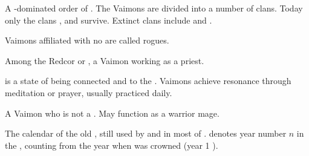 \begin{gloss}
\begin{comment}
\paragraph{Vaimon}
\end{comment}
A -dominated order of . 
The Vaimons are divided into a number of clans.
Today only the clans ,  and  survive. 
Extinct clans include \Zether and \Delaen. 

Vaimons affiliated with no \vclan are called rogues. 






\begin{subgloss}
  \begin{comment}
  \subparagraph{\cleric}
  \end{comment}
  \gitem{\cleric}
  Among the Redcor or \Telcra, a Vaimon working as a priest. 
  
  
  
  
  
  \begin{comment}
  \subparagraph{resonance}
  \end{comment}
   is a state of being connected and  to the \Archons. 
  Vaimons achieve resonance through meditation or prayer, usually practiced daily. 
  
  
  
  
  
  \begin{comment}
  \subparagraph{\templar}
  \end{comment}
  \gitem[\templars]{\templar}
  A Vaimon who is not a \cleric. 
  May function as a warrior mage. 
\end{subgloss}








\begin{comment}
\paragraph{\VaimonCalendar}
\end{comment}
\gitem{\VaimonCalendar}
The calendar of the old , still used by  and in most of . 
 denotes year number $n$ in the \ImperialCalendar{}, counting from the year when  was crowned \caliph (year 1 \IC{}). 


\end{gloss}

